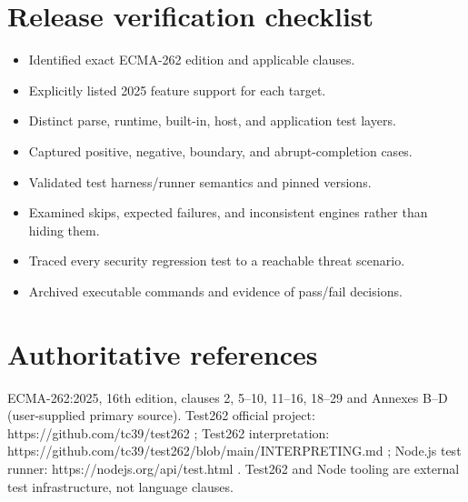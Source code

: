 \documentclass[11pt,letterpaper]{article}
\providecommand{\tightlist}{\setlength{\itemsep}{0pt}\setlength{\parskip}{0pt}}
\begin{document}
\section{Release verification checklist}\label{release-verification-checklist}

\begin{itemize}
\tightlist
\item[$\square$]
  Identified exact ECMA-262 edition and applicable clauses.
\item[$\square$]
  Explicitly listed 2025 feature support for each target.
\item[$\square$]
  Distinct parse, runtime, built-in, host, and application test layers.
\item[$\square$]
  Captured positive, negative, boundary, and abrupt-completion cases.
\item[$\square$]
  Validated test harness/runner semantics and pinned versions.
\item[$\square$]
  Examined skips, expected failures, and inconsistent engines rather than hiding them.
\item[$\square$]
  Traced every security regression test to a reachable threat scenario.
\item[$\square$]
  Archived executable commands and evidence of pass/fail decisions.
\end{itemize}

\section{Authoritative references}\label{authoritative-references}

ECMA-262:2025, 16th edition, clauses 2, 5--10, 11--16, 18--29 and Annexes B--D (user-supplied primary source). Test262 official project: https://github.com/tc39/test262 ; Test262 interpretation: https://github.com/tc39/test262/blob/main/INTERPRETING.md ; Node.js test runner: https://nodejs.org/api/test.html . Test262 and Node tooling are external test infrastructure, not language clauses.
\end{document}
